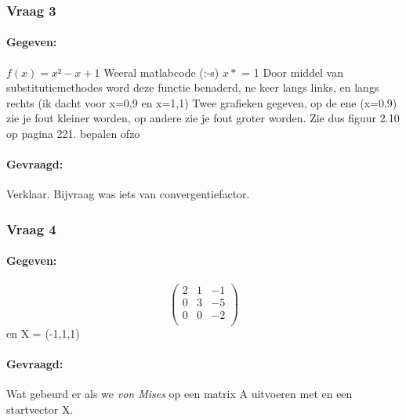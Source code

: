 \documentclass[12pt]{article}
\begin{document}
\subsubsection{Vraag 3}
\paragraph{Gegeven:}
$f(x) = x² - x + 1$ Weeral matlabcode (:-s) $x*$ = 1 Door middel van substitutiemethodes word deze functie benaderd, ne keer langs links, en langs rechts (ik dacht voor x=0,9 en x=1,1) Twee grafieken gegeven, op de ene (x=0,9) zie je fout kleiner worden, op andere zie je fout groter worden. Zie dus figuur 2.10 op pagina 221.  bepalen ofzo
\paragraph{Gevraagd:}
Verklaar. Bijvraag was iets van convergentiefactor.

\subsubsection{Vraag 4}
\paragraph{Gegeven:}
\[ \left( \begin{array}{ccc}
2 & 1 & -1 \\
0 & 3 & -5 \\
0 & 0 & -2 \\
\end{array} \right)\]
en X = (-1,1,1)
\paragraph{Gevraagd:} Wat gebeurd er als we \textit{von Mises} op een matrix A uitvoeren met en een startvector X.
\end{document}
